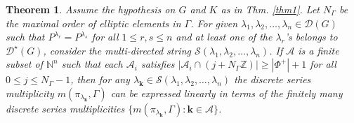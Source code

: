 \documentclass[11 pt]{amsart}
\newcommand{\Z}{{\mathbb Z}}
\newcommand{\N}{{\mathbb N}}
\newtheorem{theorem}{Theorem}[section]
\theoremstyle{definition}
\numberwithin{equation}{section}
\begin{document}
\begin{theorem}\label{cor-n-grid}
\textit{Assume the hypothesis on $G$ and $K$ as in Thm. \ref{thm1}. Let $N_{\Gamma}$ be the maximal order of elliptic elements in $\Gamma$. For given $\lambda_1, \lambda_2, \dots ,\lambda_n \in \mathcal{D}(G)$ such that $P^{\lambda_r}=P^{\lambda_s}$ for all $1 \leq r, s \leq n$ and at least one of the $\lambda_r$'s belongs to $\mathcal{D}^{\star}(G)$, consider the multi-directed string $\mathcal{S}(\lambda_1, \lambda_2, \dots ,\lambda_n)$. If $\boldsymbol{\mathcal{A}}$ is a finite subset of $\N^n$ such that each $\mathcal{A}_i$ satisfies $| \mathcal{A}_i  \cap (j + N_{\Gamma} \Z) | \geq |\Phi^+|+1$ for all $ 0 \leq j \leq N_{\Gamma}-1$, then for any  $\lambda_{\boldsymbol{k}} \in \mathcal{S}(\lambda_1, \lambda_2, \dots ,\lambda_n)$ the discrete series multiplicity $m(\pi_{\lambda_{\boldsymbol{k}}}, \Gamma)$ can be expressed linearly in terms of the finitely many discrete series multiplicities $\{ m(\pi_{\lambda_{\boldsymbol{k}}}, \Gamma) : \boldsymbol{k} \in \boldsymbol{\mathcal{A}\}}$.} 
\end{theorem}
\end{document}
